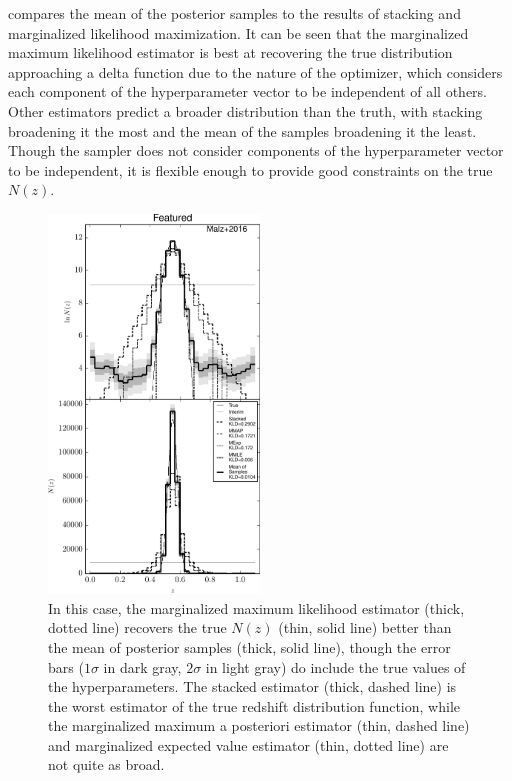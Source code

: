  compares the mean of the posterior samples to the results of stacking and marginalized likelihood maximization.  
It can be seen that the marginalized maximum likelihood estimator is best at recovering the true distribution approaching a delta function due to the nature of the optimizer, which considers each component of the hyperparameter vector to be independent of all others.  
Other estimators predict a broader distribution than the truth, with stacking broadening it the most and the mean of the samples broadening it the least.  
Though the sampler does not consider components of the hyperparameter vector to be independent, it is flexible enough to provide good constraints on the true $N(z)$.

\begin{figure}
	\includegraphics[width=0.5\textwidth]{figures/chippr/delt_comps.pdf}
	\caption{In this case, the marginalized maximum likelihood estimator (thick, dotted line) recovers the true $N(z)$ (thin, solid line) better than the mean of posterior samples (thick, solid line), though the error bars ($1\sigma$ in dark gray, $2\sigma$ in light gray) do include the true values of the hyperparameters. 
		The stacked estimator (thick, dashed line) is the worst estimator of the true redshift distribution function, while the marginalized maximum a posteriori estimator (thin, dashed line) and marginalized expected value estimator (thin, dotted line) are not quite as broad.}
\end{figure}

